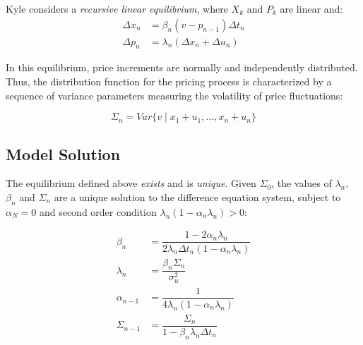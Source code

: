 \documentclass{beamer}
\begin{document}
\begin{frame}
    Kyle considers a \textit{recursive linear equilibrium}, where $X_k$ and $P_k$ are linear and:
    \begin{align}
        \Delta x_n &= \beta_n(v - p_{n-1}) \Delta t_n \\
        \Delta p_n &= \lambda_n(\Delta x_n + \Delta u_n)
    \end{align}

    In this equilibrium, price increments are normally and independently distributed. Thus, the distribution function for the pricing process is characterized by a sequence of variance parameters measuring the volatility of price fluctuations:

        \begin{equation}
            \Sigma_n = Var \{v \mid x_1 + u_1, \ldots, x_n + u_n \}
        \end{equation}

\end{frame}

\subsection{Model Solution}

\begin{frame}
    The equilibrium defined above \textit{exists} and is \textit{unique}. Given $\Sigma_0$, the values of $\lambda_n$, $\beta_n$ and $\Sigma_n$ are a unique solution to the difference equation system, subject to $\alpha_N = 0$ and second order condition $\lambda_n (1 - \alpha_n\lambda_n) > 0$:

    \begin{align}
        \beta_n &= \dfrac{1 - 2\alpha_n\lambda_n}{2\lambda_n\Delta t_n (1 - \alpha_n\lambda_n)} \\
        \lambda_n &= \dfrac{\beta_n\Sigma_n}{\sigma_u^2} \\
        \alpha_{n-1} &= \dfrac{1}{4\lambda_{n}(1 - \alpha_{n}\lambda_{n})} \\
        \Sigma_{n-1} &= \dfrac{\Sigma_{n}}{1 - \beta_{n}\lambda_{n}\Delta t_{n}}
    \end{align}
\end{frame}
\end{document}
